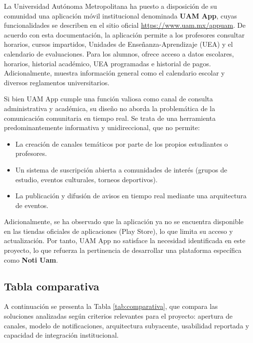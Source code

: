 La Universidad Autónoma Metropolitana ha puesto a disposición de su comunidad una aplicación móvil institucional denominada \textbf{UAM App}, cuyas funcionalidades se describen en el sitio oficial \url{https://www.uam.mx/appuam}. De acuerdo con esta documentación, la aplicación permite a los profesores consultar horarios, cursos impartidos, Unidades de Enseñanza-Aprendizaje (UEA) y el calendario de evaluaciones. Para los alumnos, ofrece acceso a datos escolares, horarios, historial académico, UEA programadas e historial de pagos. Adicionalmente, muestra información general como el calendario escolar y diversos reglamentos universitarios.

Si bien UAM App cumple una función valiosa como canal de consulta administrativa y académica, su diseño no aborda la problemática de la comunicación comunitaria en tiempo real. Se trata de una herramienta predominantemente informativa y unidireccional, que no permite:

\begin{itemize}
    \item La creación de canales temáticos por parte de los propios estudiantes o profesores.
    \item Un sistema de suscripción abierta a comunidades de interés (grupos de estudio, eventos culturales, torneos deportivos).
    \item La publicación y difusión de avisos en tiempo real mediante una arquitectura de eventos.
\end{itemize}

Adicionalmente, se ha observado que la aplicación ya no se encuentra disponible en las tiendas oficiales de aplicaciones (Play Store), lo que limita su acceso y actualización. Por tanto, UAM App no satisface la necesidad identificada en este proyecto, lo que refuerza la pertinencia de desarrollar una plataforma específica como \textbf{Noti Uam}.

\subsection{Tabla comparativa}

A continuación se presenta la Tabla \ref{tab:comparativa}, que compara las soluciones analizadas según criterios relevantes para el proyecto: apertura de canales, modelo de notificaciones, arquitectura subyacente, usabilidad reportada y capacidad de integración institucional.

